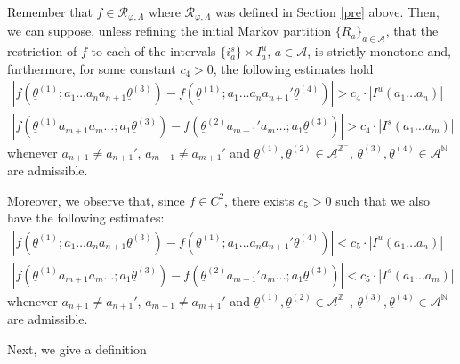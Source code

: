 \documentclass[12pt]{amsart}
\theoremstyle{plain} %
\theoremstyle{definition} %
\numberwithin{equation}{section}
\begin{document}
Remember that $f\in\mathcal{R}_{\varphi, \Lambda}$ where $\mathcal{R}_{\varphi, \Lambda}$ was defined in Section \ref{pre} above. Then, we can suppose, unless refining the initial Markov partition $\{R_a\}_{a\in\mathcal{A}}$, that the restriction of $f$ to each of the intervals $\{i_a^s\}\times I_a^u$, $a\in\mathcal{A}$, is strictly monotone and, furthermore, for some constant $c_4>0$, the following estimates hold 
\begin{eqnarray}\label{e.c1}
|f(\underline{\theta}^{(1)};a_1\dots a_n a_{n+1}\underline{\theta}^{(3)})-f(\underline{\theta}^{(1)};a_1\dots a_n a_{n+1}'\underline{\theta}^{(4)})| > c_4\cdot |I^u(a_1\dots a_n)| \\
|f(\underline{\theta}^{(1)}a_{m+1} a_m\dots ;a_1\underline{\theta}^{(3)})-f(\underline{\theta}^{(2)}a_{m+1}' a_m\dots ;a_1\underline{\theta}^{(3)})| > c_4\cdot |I^s(a_1\dots a_m)| \nonumber
\end{eqnarray}
whenever $a_{n+1}\neq a_{n+1}'$, $a_{m+1}\neq a_{m+1}'$ and $\underline{\theta}^{(1)}, \underline{\theta}^{(2)}\in\mathcal{A}^{\mathbb{Z}^-}$, $\underline{\theta}^{(3)}, \underline{\theta}^{(4)}\in\mathcal{A}^{\mathbb{N}}$ are admissible. 

Moreover, we observe that, since $f\in C^2$, there exists $c_5>0$ such that we also have the following estimates:
\begin{eqnarray}\label{e.c2}
|f(\underline{\theta}^{(1)};a_1\dots a_n a_{n+1}\underline{\theta}^{(3)})-f(\underline{\theta}^{(1)};a_1\dots a_n a_{n+1}'\underline{\theta}^{(4)})| < c_5 \cdot |I^u(a_1\dots a_n)| \\
|f(\underline{\theta}^{(1)}a_{m+1} a_m\dots ;a_1\underline{\theta}^{(3)})-f(\underline{\theta}^{(2)}a_{m+1}' a_m\dots ;a_1\underline{\theta}^{(3)})| < c_5 \cdot |I^s(a_1\dots a_m)| \nonumber
\end{eqnarray}   
whenever $a_{n+1}\neq a_{n+1}'$, $a_{m+1}\neq a_{m+1}'$ and $\underline{\theta}^{(1)}, \underline{\theta}^{(2)}\in\mathcal{A}^{\mathbb{Z}^-}$, $\underline{\theta}^{(3)}, \underline{\theta}^{(4)}\in\mathcal{A}^{\mathbb{N}}$ are admissible.

Next, we give a definition
\end{document}
